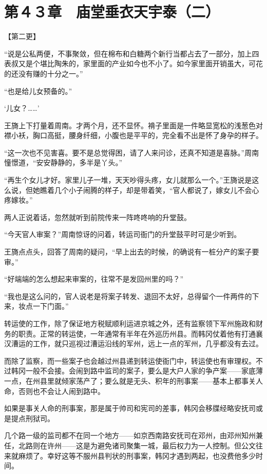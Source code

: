 \section{第４３章　庙堂垂衣天宇泰（二）}

【第二更】

“说是公私两便，不事聚敛，但在棉布和白糖两个新行当都占去了一部分，加上四表叔又是个堪比陶朱的，家里面的产业如今也不小了。如今家里面开销虽大，可花的还没有赚的十分之一。”

“也是给儿女预备的。”

‘儿女？……’

王旖上下打量着周南。才两个月，还不显怀。褙子里面是一件略显宽松的浅葱色对襟小袄，胸口高挺，腰身纤细，小腹也是平平的，完全看不出是怀了身孕的样子。

“这一次也不见害喜。要不是总觉得困，请了人来问诊，还真不知道是喜脉。”周南憧憬道，“安安静静的，多半是丫头。”

“再生个女儿才好。家里儿子一堆，天天吵得头疼，女儿就那么一个。”王旖说是这么说，但她瞧着几个小子闹腾的样子，却是带着笑，“官人都说了，嫁女儿不会心疼嫁妆。”

两人正说着话，忽然就听到前院传来一阵咚咚响的升堂鼓。

“今天官人审案？”周南惊讶的问着，转运司衙门的升堂鼓平时可是少听到。

王旖点点头，回答了周南的疑问，“早上出去的时候，的确说有一桩分产的案子要审。”

“好端端的怎么想起来审案的，往常不是发回州里的吗？”

“我也是这么问的，官人说老是将案子转发、退回不太好，总得留个一件两件的下来，妆点一下门面。”

转运使的工作，除了保证地方税赋顺利运进京城之外，还有监察领下军州施政和财务的职责。正常的转运使，一年通常有半年在外巡历州县。而韩冈仗着他有打通襄汉漕运的工作，就只巡视过漕运沿线的军州，远上一点的军州，几乎都没有去过。

而除了监察，而一些案子也会越过州县递到转运使衙门中，转运使也有审理权。不过韩冈一般不会接。会闹到路中监司的案子，要么是大户人家的争产案——家底薄一点，在州县里就倾家荡产了；要么就是无头、积年的刑事案——基本上都事关人命，否则也不会让人闹到路中。

如果是事关人命的刑事案，那是属于帅司和宪司的差事，韩冈会移牒经略安抚司或是提点刑狱司。

几个路一级的监司都不在同一个地方——如京西南路安抚司在邓州，由邓州知州兼任，北路则在许州——这是为避免诸司聚集一城，最后权力为一人控制。但公文往来就麻烦了。幸好这等不服州县判状的刑事案，韩冈才遇到两起，也没费他多少时间。

